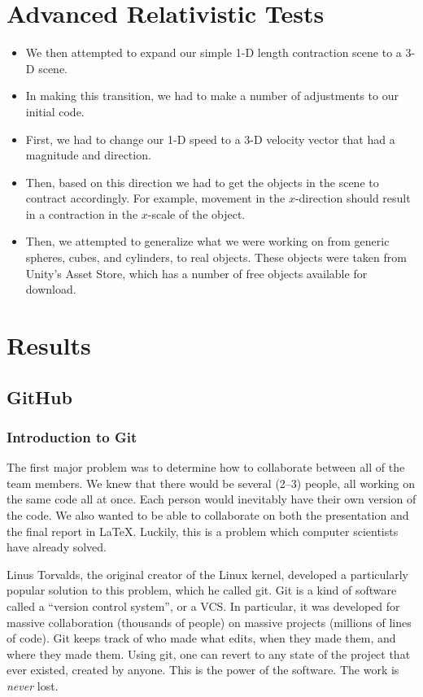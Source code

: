 \documentclass[12pt]{article}
\begin{document}
\section*{Advanced Relativistic Tests}
\begin{itemize}
	\item We then attempted to expand our simple 1-D length contraction scene to a 3-D scene.
	\item In making this transition, we had to make a number of adjustments to our initial code. 
	\item First, we had to change our 1-D speed to a 3-D velocity vector that had a magnitude and direction. 
	\item Then, based on this direction we had to get the objects in the scene to contract accordingly. For example, movement in the $x$-direction should result in a contraction in the $x$-scale of the object.
	\item Then, we attempted to generalize what we were working on from generic spheres, cubes, and cylinders, to real objects. These objects were taken from Unity's Asset Store, which has a number of free objects available for download. 
\end{itemize}

\section{Results}

\subsection{GitHub}
\subsubsection{Introduction to Git}
The first major problem was to determine how to collaborate between all of the team members. We knew that there would be several (2--3) people, all working on the same code all at once. Each person would inevitably have their own version of the code. We also wanted to be able to collaborate on both the presentation and the final report in \LaTeX{}. Luckily, this is a problem which computer scientists have already solved.

Linus Torvalds, the original creator of the Linux kernel, developed a particularly popular solution to this problem, which he called git. Git is a kind of software called a \enquote{version control system}, or a VCS. In particular, it was developed for massive collaboration (thousands of people) on massive projects (millions of lines of code). Git keeps track of who made what edits, when they made them, and where they made them. Using git, one can revert to any state of the project that ever existed, created by anyone. This is the power of the software. The work is \emph{never} lost. 
\end{document}
